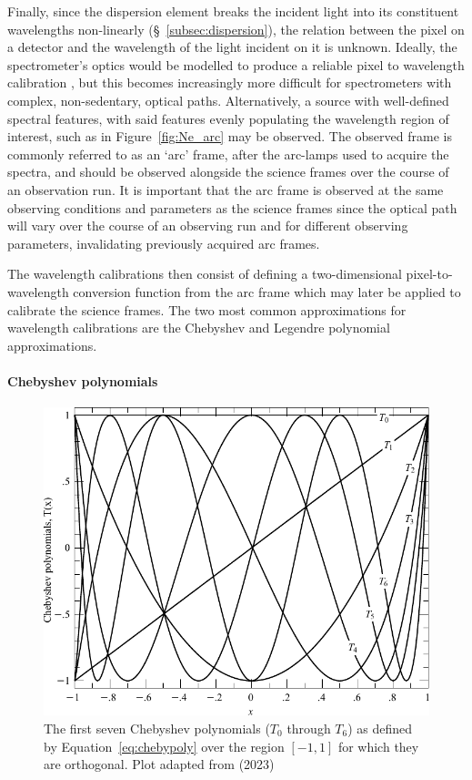 Finally, since the dispersion element breaks the incident light into its constituent wavelengths non-linearly (\S~\ref{subsec:dispersion}), the relation between the pixel on a detector and the wavelength of the light incident on it is unknown. Ideally, the spectrometer's optics would be modelled to produce a reliable pixel to wavelength calibration \citep[see E.g.][]{WavCalSpectraModel}, but this becomes increasingly more difficult for spectrometers with complex, non-sedentary, optical paths. Alternatively, a source with well-defined spectral features, with said features evenly populating the wavelength region of interest, such as in Figure~\ref{fig:Ne_arc} may be observed. The observed frame is commonly referred to as an `arc' frame, after the arc-lamps used to acquire the spectra, and should be observed alongside the science frames over the course of an observation run. It is important that the arc frame is observed at the same observing conditions and parameters as the science frames since the optical path will vary over the course of an observing run and for different observing parameters, invalidating previously acquired arc frames.

The wavelength calibrations then consist of defining a two-dimensional pixel-to-wave\-length conversion function from the arc frame which may later be applied to calibrate the science frames. The two most common approximations for wavelength calibrations are the Chebyshev and Legendre polynomial approximations.

\paragraph{Chebyshev polynomials}

\begin{figure}[t]
    \centering
    \includegraphics[width = 12cm]{figures/2_chebyshev.pdf}
    \caption{The first seven Chebyshev polynomials ($T_0$ through $T_{6}$) as defined by Equation~\ref{eq:chebypoly} over the region $[-1, 1]$ for which they are orthogonal. Plot adapted from \citep{numerical_recipes} (2023)\protect\footnotemark}
    \label{fig:chebyshev}
\end{figure}

